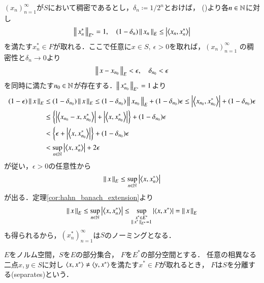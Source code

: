 	\begin{prf}
		$(x_n)_{n=1}^{\infty}$が$S$において稠密であるとし，$\delta_n \coloneqq 1/2^n$とおけば，
		()より各$n \in \mathbb{N}$に対し
		\begin{align}
			\Norm{x^*_n}{E^*} = 1,
			\quad (1 - \delta_n) \Norm{x_n}{E} \leq \left| \inprod<x_n,x^*_n> \right|
		\end{align}
		を満たす$x^*_n \in F$が取れる．ここで任意に$x \in S,\ \epsilon > 0$を取れば，$(x_n)_{n=1}^{\infty}$
		の稠密性と$\delta_n \longrightarrow 0$より
		\begin{align}
			\left\|\, x - x_{n_0}\, \right\|_{E} < \epsilon,
			\quad \delta_{n_0} < \epsilon
		\end{align}
		を同時に満たす$n_0 \in \mathbb{N}$が存在する．$\left\|\, x^*_{n_0}\, \right\|_{E^*} = 1$より
		\begin{align}
			(1 - \epsilon) \Norm{x}{E}
			&\leq (1 - \delta_{n_0}) \Norm{x}{E}
			\leq (1 - \delta_{n_0}) \Norm{x_{n_0}}{E} + (1 - \delta_{n_0}) \epsilon
			\leq \left| \inprod<x_{n_0},x^*_{n_0}> \right| + (1 - \delta_{n_0}) \epsilon \\
			&\leq \left\{ \left| \inprod<x_{n_0}-x,x^*_{n_0}> \right| 
				+ \left| \inprod<x,x^*_{n_0}> \right| \right\} + (1 - \delta_{n_0}) \epsilon \\
			&< \left\{ \epsilon + \left| \inprod<x,x^*_{n_0}> \right| \right\} + (1 - \delta_{n_0}) \epsilon \\
			&< \sup{n \in \N}{\left| \inprod<x,x^*_n> \right|} + 2 \epsilon
		\end{align}
		が従い，$\epsilon > 0$の任意性から
		\begin{align}
			\Norm{x}{E} \leq \sup{n \in \N}{\left| \inprod<x,x^*_n> \right|}
		\end{align}
		が出る．定理\ref{cor:hahn_banach_extension}より
		\begin{align}
			\Norm{x}{E} \leq \sup{n \in \N}{\left| \inprod<x,x^*_n> \right|}
			\leq \sup{\substack{x^* \in E^* \\ \Norm{x^*}{E^*} = 1}}{\left| \inprod<x,x^*> \right|}
			= \Norm{x}{E}
		\end{align}
		も得られるから，$\left( x^*_n \right)_{n=1}^{\infty}$は$S$のノーミングとなる．
		\QED
	\end{prf}
	
	\begin{screen}
		\begin{dfn}[分離]
			$E$をノルム空間，$S$を$E$の部分集合，
			$F$を$E^*$の部分空間とする．
			任意の相異なる二点$x,y \in S$に対し
			$\inprod<x,x^*> \neq \inprod<y,x^*>$を満たす$x^* \in F$が取れるとき，
			$F$は$S$を分離する(separates)という．
		\end{dfn}
	\end{screen}
	
